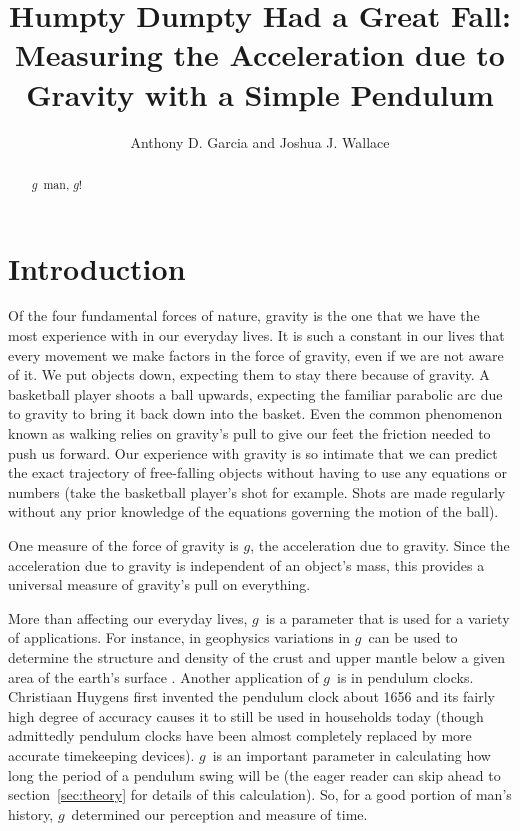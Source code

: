 \documentclass[iop]{emulateapj}
\def\g{$g$}
\begin{document}
\title{Humpty Dumpty Had a Great Fall: Measuring the Acceleration due to Gravity with a Simple Pendulum}

\author{ Anthony D. Garcia
and
Joshua J. Wallace}

\begin{abstract}

\g\ man, \g!

\end{abstract}

\section{Introduction}

Of the four fundamental forces of nature, gravity is the one that we have the 
most experience with in our everyday lives.  It is such a constant in our lives 
that every movement we make factors in the force of gravity, even if we are not
aware of it. We put objects down, expecting them to stay there because of 
gravity. A basketball player shoots a ball upwards, expecting the familiar 
parabolic arc due to gravity to bring it back down into the basket.  Even the
common phenomenon known as walking relies on gravity's pull to give our feet
the friction needed to push us forward. Our experience with gravity is so
intimate that we can predict the exact trajectory of free-falling objects 
without having to use any equations or numbers (take the basketball player's 
shot for example. Shots are made regularly without any prior knowledge of 
the equations governing the motion of the ball).

One measure of the force of gravity is \g, the acceleration due to gravity. 
Since the acceleration due to gravity is independent of an object's mass, 
this provides a universal measure of gravity's pull on everything.

More than affecting our everyday lives, \g\ is a parameter that is used 
for a variety of applications. For instance, in geophysics 
variations in \g\ can be used to determine the structure and density of the 
crust and upper mantle below a given area of the earth's surface \citet{Geo}.
Another application of \g\ is in pendulum clocks. Christiaan Huygens 
first invented the pendulum clock about 1656 \citet{Murin} and its fairly high 
degree of accuracy causes it to still be used in households today (though 
admittedly pendulum clocks have been almost completely replaced by more 
accurate time\-keeping devices).  \g\ is an important parameter in 
calculating how long the period of a pendulum swing will be (the eager reader 
can skip ahead to section~\ref{sec:theory} for details of this calculation).  
So, for a good 
portion of man's history, \g\ determined our perception and measure of time.
\end{document}
